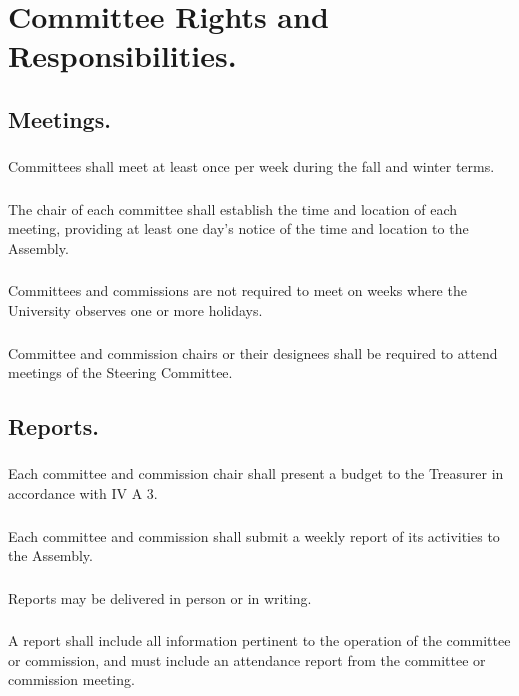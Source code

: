 \documentclass{rules}
\begin{document}
\section{Committee Rights and Responsibilities.}
\subsection{Meetings.}
\subsubsection{}
Committees shall meet at least once per week during the fall and winter terms.
\subsubsection{}
The chair of each committee shall establish the time and location of each meeting, providing at least one day's notice of the time and location to the Assembly.
\subsubsection{}
Committees and commissions are not required to meet on weeks where the University observes one or more holidays.
\subsubsection{}
Committee and commission chairs or their designees shall be required to attend meetings of the Steering Committee.
\subsection{Reports.}
\subsubsection{}
Each committee and commission chair shall present a budget to the Treasurer in accordance with IV A 3.
\subsubsection{}
Each committee and commission shall submit a weekly report of its activities to the Assembly. 
\subsubsection{}
Reports may be delivered in person or in writing.
\subsubsection{}
A report shall include all information pertinent to the operation of the committee or commission, and must include an attendance report from the committee or commission meeting.
\end{document}
